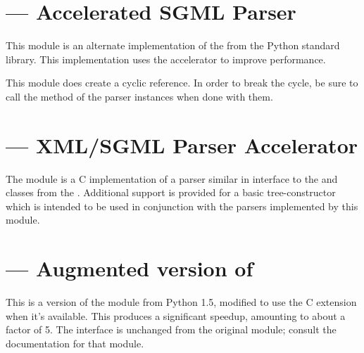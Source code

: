 \documentclass{howto}
\begin{document}
\begin{seealso}
\end{seealso}


\section{ ---
         Accelerated SGML Parser}


This module is an alternate implementation of the
from the Python standard library.  This implementation uses the
 accelerator to improve performance.

This module does create a cyclic reference.  In order to break the
cycle, be sure to call the  method of the parser
instances when done with them.


\section{ ---
         XML/SGML Parser Accelerator}


The  module is a C implementation of a
parser similar in interface to the  and
 classes from the .  Additional
support is provided for a basic tree-constructor which is intended to
be used in conjunction with the parsers implemented by this module.


\section{ ---
         Augmented version of }

This is a version of the  module from Python 1.5,
modified to use the  C extension when
it's available.  This produces a significant speedup, amounting to
about a factor of 5.  The interface is unchanged from the original
 module; consult the
 documentation for that module.
\end{document}
